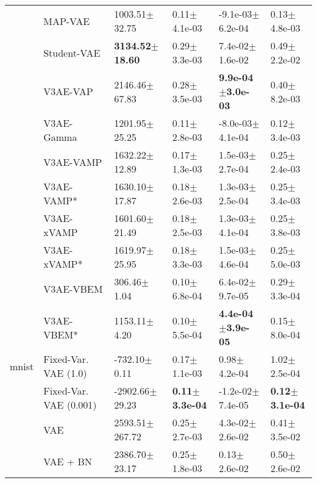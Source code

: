 \begin{tabular}{llllll}
             & MAP-VAE &            1003.51$\pm$32.75 &              0.11$\pm$4.1e-03 &          -9.1e-03$\pm$6.2e-04 &              0.13$\pm$4.8e-03 \\
             & Student-VAE &   \textbf{3134.52$\pm$18.60} &              0.29$\pm$3.3e-03 &           7.4e-02$\pm$1.6e-02 &              0.49$\pm$2.2e-02 \\
             & V3AE-VAP &            2146.46$\pm$67.83 &              0.28$\pm$3.5e-03 &  \textbf{9.9e-04$\pm$3.0e-03} &              0.40$\pm$8.2e-03 \\
             & V3AE-Gamma &            1201.95$\pm$25.25 &              0.11$\pm$2.8e-03 &          -8.0e-03$\pm$4.1e-04 &              0.12$\pm$3.4e-03 \\
             & V3AE-VAMP &            1632.22$\pm$12.89 &              0.17$\pm$1.3e-03 &           1.5e-03$\pm$2.7e-04 &              0.25$\pm$2.4e-03 \\
             & V3AE-VAMP* &            1630.10$\pm$17.87 &              0.18$\pm$2.6e-03 &           1.3e-03$\pm$2.5e-04 &              0.25$\pm$3.4e-03 \\
             & V3AE-xVAMP &            1601.60$\pm$21.49 &              0.18$\pm$2.5e-03 &           1.3e-03$\pm$4.1e-04 &              0.25$\pm$3.8e-03 \\
             & V3AE-xVAMP* &            1619.97$\pm$25.95 &              0.18$\pm$3.3e-03 &           1.5e-03$\pm$4.6e-04 &              0.25$\pm$5.0e-03 \\
             & V3AE-VBEM &              306.46$\pm$1.04 &              0.10$\pm$6.8e-04 &           6.4e-02$\pm$9.7e-05 &              0.29$\pm$3.3e-04 \\
             & V3AE-VBEM* &             1153.11$\pm$4.20 &              0.10$\pm$5.5e-04 &  \textbf{4.4e-04$\pm$3.9e-05} &              0.15$\pm$8.0e-04 \\
mnist & Fixed-Var. VAE (1.0) &             -732.10$\pm$0.11 &              0.17$\pm$1.1e-03 &              0.98$\pm$4.2e-04 &              1.02$\pm$2.5e-04 \\
             & Fixed-Var. VAE (0.001) &           -2902.66$\pm$29.23 &     \textbf{0.11$\pm$3.3e-04} &          -1.2e-02$\pm$7.4e-05 &     \textbf{0.12$\pm$3.1e-04} \\
             & VAE &           2593.51$\pm$267.72 &              0.25$\pm$2.7e-03 &           4.3e-02$\pm$2.6e-02 &              0.41$\pm$3.5e-02 \\
             & VAE + BN &            2386.70$\pm$23.17 &              0.25$\pm$1.8e-03 &              0.13$\pm$2.6e-02 &              0.50$\pm$2.6e-02 \\

\end{tabular}
